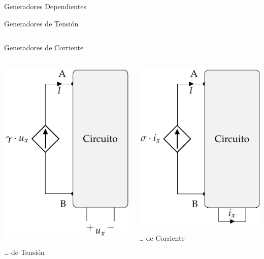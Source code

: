 \documentclass[aspectratio=169, usenames,svgnames,dvipsnames]{beamer}
\begin{document}
\begin{frame}[label={sec:orgf08f71f}]{Generadores Dependientes}
\begin{block}{Generadores de Tensión}
\begin{columns}
\begin{column}{0.5\columnwidth}
\end{column}
\end{columns}
\end{block}
\begin{block}{Generadores de Corriente}
\begin{columns}
\begin{column}{0.5\columnwidth}
 \begin{center}
\includegraphics[height=0.7\textheight]{../figs/FuenteCorrienteDependienteTension.pdf}
\end{center}
\ldots{} de Tensión
\end{column}
\begin{column}{0.5\columnwidth}
 \begin{center}
\includegraphics[height=0.7\textheight]{../figs/FuenteCorrienteDependienteCorriente.pdf}
\end{center}
\ldots{} de Corriente
\end{column}
\end{columns}
\end{block}
\end{frame}
\end{document}
